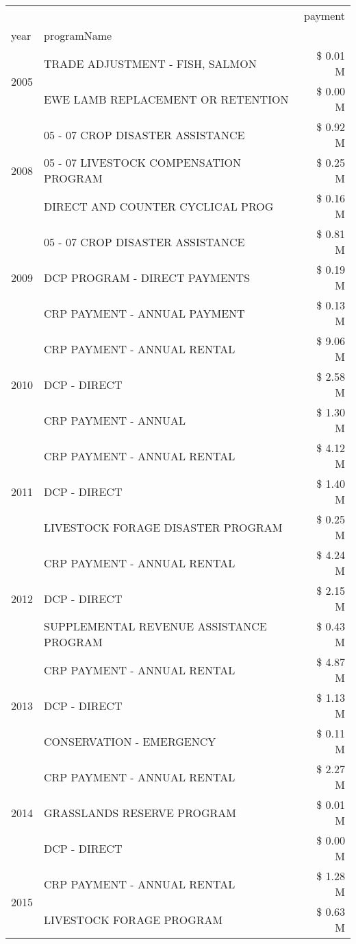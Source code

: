 \begin{tabular}{llr}
\toprule
 &  & payment \\
year & programName &  \\
\midrule
\multirow[t]{2}{*}{2005} & TRADE ADJUSTMENT - FISH, SALMON & \$ 0.01 M \\
 & EWE LAMB REPLACEMENT OR RETENTION & \$ 0.00 M \\
\cline{1-3}
\multirow[t]{3}{*}{2008} & 05 - 07 CROP DISASTER ASSISTANCE & \$ 0.92 M \\
 & 05 - 07 LIVESTOCK COMPENSATION PROGRAM & \$ 0.25 M \\
 & DIRECT AND COUNTER CYCLICAL PROG & \$ 0.16 M \\
\cline{1-3}
\multirow[t]{3}{*}{2009} & 05 - 07 CROP DISASTER ASSISTANCE & \$ 0.81 M \\
 & DCP PROGRAM - DIRECT PAYMENTS & \$ 0.19 M \\
 & CRP PAYMENT - ANNUAL PAYMENT & \$ 0.13 M \\
\cline{1-3}
\multirow[t]{3}{*}{2010} & CRP PAYMENT - ANNUAL RENTAL & \$ 9.06 M \\
 & DCP - DIRECT & \$ 2.58 M \\
 & CRP PAYMENT - ANNUAL & \$ 1.30 M \\
\cline{1-3}
\multirow[t]{3}{*}{2011} & CRP PAYMENT - ANNUAL RENTAL & \$ 4.12 M \\
 & DCP - DIRECT & \$ 1.40 M \\
 & LIVESTOCK FORAGE DISASTER PROGRAM & \$ 0.25 M \\
\cline{1-3}
\multirow[t]{3}{*}{2012} & CRP PAYMENT - ANNUAL RENTAL & \$ 4.24 M \\
 & DCP - DIRECT & \$ 2.15 M \\
 & SUPPLEMENTAL REVENUE ASSISTANCE PROGRAM & \$ 0.43 M \\
\cline{1-3}
\multirow[t]{3}{*}{2013} & CRP PAYMENT - ANNUAL RENTAL & \$ 4.87 M \\
 & DCP - DIRECT & \$ 1.13 M \\
 & CONSERVATION - EMERGENCY & \$ 0.11 M \\
\cline{1-3}
\multirow[t]{3}{*}{2014} & CRP PAYMENT - ANNUAL RENTAL & \$ 2.27 M \\
 & GRASSLANDS RESERVE PROGRAM & \$ 0.01 M \\
 & DCP - DIRECT & \$ 0.00 M \\
\cline{1-3}
\multirow[t]{3}{*}{2015} & CRP PAYMENT - ANNUAL RENTAL & \$ 1.28 M \\
 & LIVESTOCK FORAGE PROGRAM & \$ 0.63 M \\

\end{tabular}

